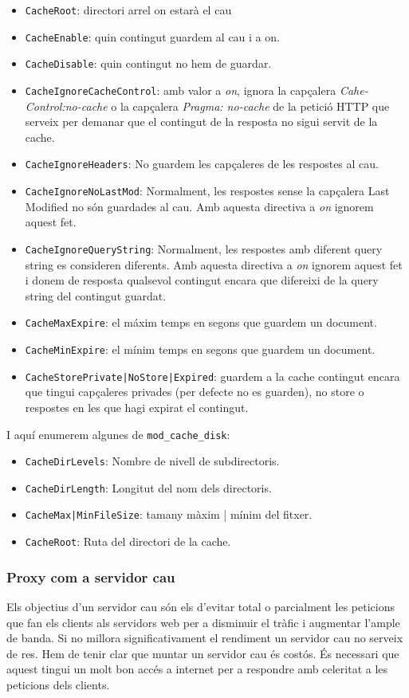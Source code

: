 \documentclass[a4paper, 11pt]{article}
\begin{document}
\begin{itemize}
	\item \verb+CacheRoot+: directori arrel on estarà el cau
	\item \verb+CacheEnable+: quin contingut guardem al cau i a on.
	\item \verb+CacheDisable+: quin contingut no hem de guardar.
	\item \verb+CacheIgnoreCacheControl+: amb valor a \textit{on}, ignora la capçalera \textit{Cahe-Control:no-cache} o la capçalera \textit{Pragma: no-cache} de la petició HTTP que serveix per demanar que el contingut de la resposta no sigui servit de la cache.
	\item \verb+CacheIgnoreHeaders+: No guardem les capçaleres de les respostes al cau.
	\item \verb+CacheIgnoreNoLastMod+: Normalment, les respostes sense la capçalera Last Modified no són guardades al cau. Amb aquesta directiva a \textit{on} ignorem aquest fet.
	\item \verb+CacheIgnoreQueryString+: Normalment, les respostes amb diferent query string es consideren diferents. Amb aquesta directiva a \textit{on} ignorem aquest fet i donem de resposta qualsevol contingut encara que difereixi de la query string del contingut guardat.
	\item \verb+CacheMaxExpire+: el máxim temps en segons que guardem un document.
	\item \verb+CacheMinExpire+: el mínim temps en segons que guardem un document.
	\item \verb+CacheStorePrivate|NoStore|Expired+: guardem a la cache contingut encara que tingui capçaleres privades (per defecte no es guarden), no store o respostes en les que hagi expirat el contingut.
\end{itemize}

I aquí enumerem algunes de \verb+mod_cache_disk+:
\begin{itemize}
	\item \verb+CacheDirLevels+: Nombre de nivell de subdirectoris.
	\item \verb+CacheDirLength+: Longitut del nom dels directoris.
	\item \verb+CacheMax|MinFileSize+: tamany màxim | mínim del fitxer.
	\item \verb+CacheRoot+: Ruta del directori de la cache.
\end{itemize}
\subsubsection{Proxy com a servidor cau}
Els objectius d'un servidor cau són els d'evitar total o parcialment les peticions que fan els clients als servidors web per a disminuir el tràfic i augmentar l'ample de banda. Si no millora significativament el rendiment un servidor cau no serveix de res. Hem de tenir clar que muntar un servidor cau \'es costós. \'Es necessari que aquest tingui un molt bon acc\'es a internet per a respondre amb celeritat a les peticions dels clients. 
\end{document}
